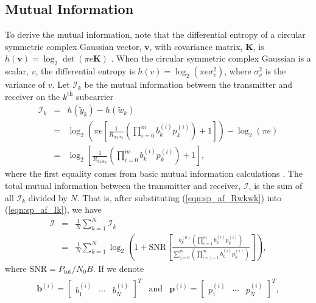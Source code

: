 \subsection{Mutual Information}
\label{subsec:sp_af_mi}

To derive the mutual information, note that the differential entropy of a circular symmetric complex Gaussian vector, $\mathbf{v}$, with covariance matrix, $\mathbf{K}$, is $h\left(\mathbf{v}\right) = \log_2 \det \left( \pi e \mathbf{K} \right)$ \cite{article:Telatar01}.  When the circular symmetric complex Gaussian is a scalar, $v$, the differential entropy is $h\left(v\right) = \log_2 \left( \pi e \sigma_v^2 \right)$, where $\sigma_v^2$ is the variance of $v$.  Let $\mathcal{I}_k$ be the mutual information between the transmitter and receiver on the $k^{\mbox{th}}$ subcarrier
\begin{eqnarray}
\mathcal{I}_k & = & h\left( \tilde{y}_k \right) - h \left( \tilde{w}_k \right) \\
& = & \log_2 \left( \pi e \left[ \frac{1}{R_{w_kw_k}} \left( \prod_{i=0}^m b_k^{(i)} p_k^{(i)} \right) + 1 \right] \right)
- \log_2 \left( \pi e \right) \\
& = & \log_2 \left[ \frac{1}{R_{w_kw_k}} \left( \prod_{i=0}^m b_k^{(i)} p_k^{(i)} \right) + 1 \right],
\label{eqn:sp_af_Ik}
\end{eqnarray}
where the first equality comes from basic mutual information calculations \cite{book:Cover01}.  The total mutual information between the transmitter and receiver, $\mathcal{I}$, is the sum of all $\mathcal{I}_k$ divided by $N$.  That is, after substituting (\ref{eqn:sp_af_Rwkwk}) into (\ref{eqn:sp_af_Ik}), we have
\begin{eqnarray}
\mathcal{I} & = &\frac{1}{N} \sum_{k=1}^N \mathcal{I}_k\\
& = &\frac{1}{N} \sum_{k=1}^N \log_2 \left( 1 + \mbox{SNR}
\left[ \frac{b_k^{(0)}\left( \prod_{i=1}^m b_k^{(i)}  p_k^{(i)}  \right)}
{\sum_{j=0}^m \left( \prod_{i=j+1}^m b_k^{(i)}  p_k^{(i)}  \right) }\right]
 \right),
\label{eqn:sp_af_I}
\end{eqnarray}
where $\mbox{SNR} = P_{\mbox{tot}} / N_0 B$.  If we denote
\begin{eqnarray}
\begin{array}{ccc}
\mathbf{b}^{(i)} = \left[ \begin{array}{ccc}
b_1^{(i)} & \cdots & b_N^{(i)}
\end{array}
\right]^T &  \mbox{and} &   
\mathbf{p}^{(i)} = \left[ \begin{array}{ccc}
p_1^{(i)} & \cdots & p_N^{(i)}
\end{array}
\right]^T,
\end{array} 
\end{eqnarray} 

